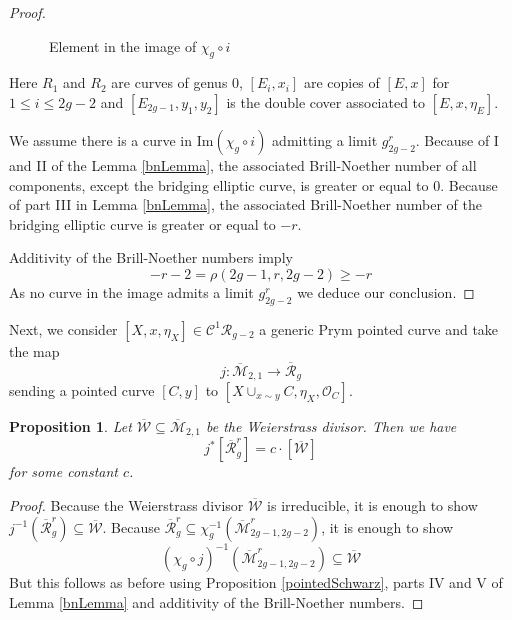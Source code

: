 \documentclass{article}
\theoremstyle{plain}
\newtheorem{prop}[trm]{Proposition}
\theoremstyle{definition}
\def\OO{\mathcal{O}}
\def\cR{\mathcal{R}}
\def\rr{\overline{\mathcal{R}}}
\def\mm{\overline{\mathcal{M}}}
\begin{document}
\begin{proof}
\begin{figure}[H]
\caption{Element in the image of $\chi_g\circ i$}
		\end{figure}
Here $R_1$ and $R_2$ are curves of genus 0, $[E_i,x_i]$ are copies of $[E,x]$ for $1\leq i \leq 2g-2$ and $[E_{2g-1}, y_1, y_2]$ is the double cover associated to $[E,x,\eta_E]$. 

We assume there is a curve in $\mathrm{Im}(\chi_g\circ i)$ admitting a limit $g^r_{2g-2}$. Because of I and II of the Lemma \ref{bnLemma}, the associated Brill-Noether number of all components, except the bridging elliptic curve, is greater or equal to 0. Because of part III in Lemma \ref{bnLemma}, the associated Brill-Noether number of the bridging elliptic curve is greater or equal to $-r$. 

Additivity of the Brill-Noether numbers imply 
\[ -r-2 = \rho(2g-1, r, 2g-2) \geq -r \]
As no curve in the image admits a limit $g^r_{2g-2}$ we deduce our conclusion. 
\end{proof}

Next, we consider $[X,x,\eta_X] \in \mathcal{C}^1\cR_{g-2}$ a generic Prym pointed curve and take the map 
\[ j\colon \mm_{2,1}\rightarrow \rr_g \]
sending a pointed curve $[C,y]$ to $ [X\cup_{x\sim y}C, \eta_X, \OO_C]$.
\begin{prop} \label{weierstrasspull} Let $\overline{\mathcal{W}} \subseteq \mm_{2,1}$ be the Weierstrass divisor. Then we have
	\[ j^*[\rr^r_g]  = c\cdot[\overline{\mathcal{W}}] \]
for some constant $c$. 
\end{prop}
\begin{proof} Because the Weierstrass divisor $\overline{\mathcal{W}}$ is irreducible, it is enough to show $j^{-1}(\rr^r_g) \subseteq    \overline{\mathcal{W}}$. Because $\rr^r_g \subseteq \chi_g^{-1}(\mm^r_{2g-1,2g-2})$, it is enough to show 
	\[ (\chi_g\circ j)^{-1}(\mm^r_{2g-1,2g-2}) \subseteq \overline{\mathcal{W}} \] 
But this follows as before using Proposition \ref{pointedSchwarz}, parts IV and V of Lemma \ref*{bnLemma} and additivity of the Brill-Noether numbers. 
\end{proof}
\end{document}
